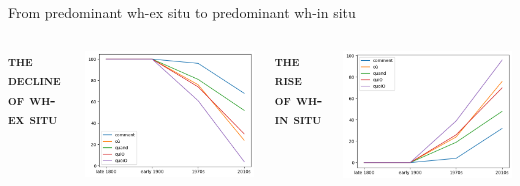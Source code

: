 \documentclass[lesson_slides]{subfiles}
\begin{document}
\begin{frame}[c]{From predominant wh-ex situ to predominant wh-in situ}

\begin{columns}
        \centering
        \textbf{\textsc{the decline of wh-ex situ}}
    \begin{center}
        \includegraphics[width=\linewidth]{images/all.png}
    \end{center}
        \centering
        \textbf{\textsc{the rise of wh-in situ}}
        \begin{center}
        \includegraphics[width=\linewidth]{images/insitu.png}
    \end{center}
    \end{columns}
  
\end{frame}
\end{document}
